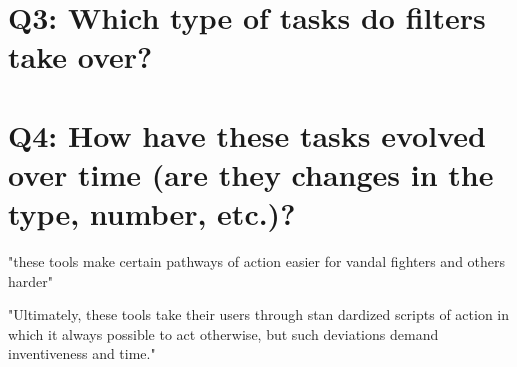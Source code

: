 \section{Q3: Which type of tasks do filters take over?}

\section{Q4: How have these tasks evolved over time (are they changes in the type, number, etc.)?}




\begin{comment}
Alternative approaches to community management:
compare with Surviving the Eternal September paper~\cite{KieMonHill2016}
"importance of strong
systems of norm enforcement made possible by leadership,
community engagement, and technology."

"emphasizing decentralized moderation" //all community members help enforce the norms
"ensuring enough leadership capacity is available
when an influx of newcomers is anticipated."
"Designers may
benefit by focusing on tools to let existing leaders bring others
on board and help them clearly communicate norms."
"designers should support an ecosystem of accessible and ap-
propriate moderator tools."

\end{comment}



\cite{GeiRib2010}

"these tools make certain pathways of action easier for vandal
fighters and others harder"

"Ultimately, these tools take their users
through stan dardized scripts of action in which it always
possible to act otherwise, but such deviations demand
inventiveness and time."

